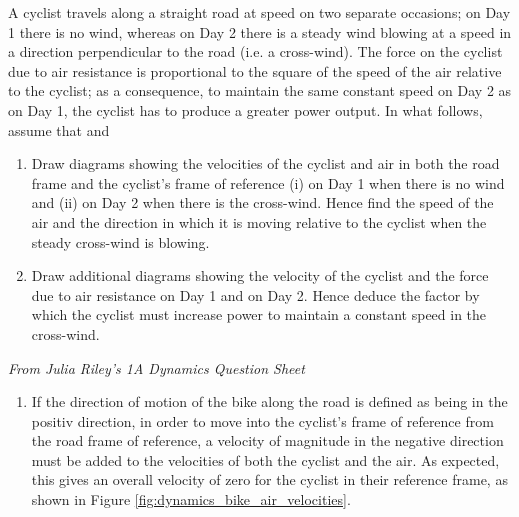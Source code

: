 
\begin{problem} 
{A cyclist travels along a straight road at speed  on two separate occasions; on Day 1 there is no wind, whereas on Day 2 there is a steady wind blowing at a speed  in a direction perpendicular to the road (i.e. a cross-wind). The force on the cyclist due to air resistance is proportional to the square of the speed of the air relative to the cyclist; as a consequence, to maintain the same constant speed  on Day 2 as on Day 1, the cyclist has to produce a greater power output. In what follows, assume that  and 
\begin{enumerate}
\item Draw diagrams showing the velocities of the cyclist and air in both the road frame and the cyclist’s frame of reference (i) on Day 1 when there is no wind and (ii) on Day 2 when there is the cross-wind. Hence find the speed of the air and the
direction in which it is moving relative to the cyclist when the steady cross-wind is blowing.
\item  Draw additional diagrams showing the velocity of the cyclist and the force due to air resistance on Day 1 and on Day 2. Hence deduce the factor by which the cyclist must increase power to maintain a constant speed in the cross-wind.
\end{enumerate}}
{\textit{From Julia Riley's 1A Dynamics Question Sheet}}
{\begin{enumerate}
\item 
If the direction of motion of the bike along the road is defined as being in the positiv   direction, in order to move into the cyclist's frame of reference from the road frame of reference, a velocity of magnitude  in the negative  direction must be added to the velocities of both the cyclist and the air. As expected, this gives an overall velocity of zero for the cyclist in their reference frame, as shown in Figure \ref{fig:dynamics_bike_air_velocities}.


\end{enumerate}}
\end{problem}
